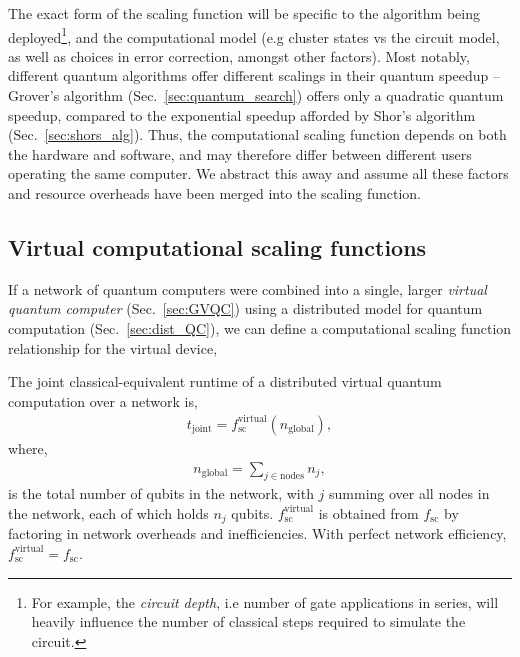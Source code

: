 The exact form of the scaling function will be specific to the algorithm being deployed\footnote{For example, the \textit{circuit depth}, i.e number of gate applications in series, will heavily influence the number of classical steps required to simulate the circuit.}, and the computational model (e.g cluster states vs the circuit model, as well as choices in error correction, amongst other factors). Most notably, different quantum algorithms offer different scalings in their quantum speedup -- Grover's algorithm (Sec.~\ref{sec:quantum_search}) offers only a quadratic quantum speedup, compared to the exponential speedup afforded by Shor's algorithm (Sec.~\ref{sec:shors_alg}). Thus, the computational scaling function depends on both the hardware and software, and may therefore differ between different users operating the same computer. We abstract this away and assume all these factors and resource overheads have been merged into the scaling function.

%
%

\subsection{Virtual computational scaling functions}

If a network of quantum computers were combined into a single, larger \textit{virtual quantum computer} (Sec.~\ref{sec:GVQC}) using a distributed model for quantum computation (Sec.~\ref{sec:dist_QC}), we can define a computational scaling function relationship for the virtual device,

\begin{definition}
The joint classical-equivalent runtime of a distributed virtual quantum computation over a network is,
\begin{align}
t_\mathrm{joint} = f_\mathrm{sc}^\mathrm{virtual}(n_\mathrm{global}),
\end{align}
where,
\begin{align}
n_\mathrm{global} = \sum_{j\in\mathrm{nodes}} n_j,
\end{align}
is the total number of qubits in the network, with $j$ summing over all nodes in the network, each of which holds $n_j$ qubits. $f_\mathrm{sc}^\mathrm{virtual}$ is obtained from $f_\mathrm{sc}$ by factoring in network overheads and inefficiencies. With perfect network efficiency, \mbox{$f_\mathrm{sc}^\mathrm{virtual}=f_\mathrm{sc}$}.
\end{definition}

